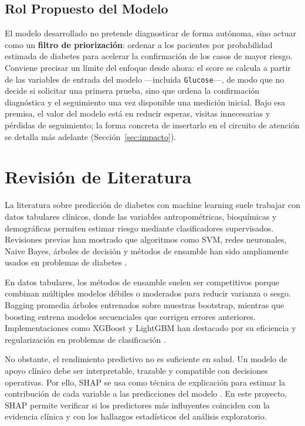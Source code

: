 \documentclass[conference]{IEEEtran}
\newcommand{\code}[1]{\texttt{#1}}
\begin{document}
\subsection{Rol Propuesto del Modelo}

El modelo desarrollado no pretende diagnosticar de forma autónoma, sino actuar como un \textbf{filtro de priorización}: ordenar a los pacientes por probabilidad estimada de diabetes para acelerar la confirmación de los casos de mayor riesgo. Conviene precisar un límite del enfoque desde ahora: el score se calcula a partir de las variables de entrada del modelo ---incluida \code{Glucose}---, de modo que no decide si solicitar una primera prueba, sino que ordena la confirmación diagnóstica y el seguimiento una vez disponible una medición inicial. Bajo esa premisa, el valor del modelo está en reducir esperas, visitas innecesarias y pérdidas de seguimiento; la forma concreta de insertarlo en el circuito de atención se detalla más adelante (Sección~\ref{sec:impacto}).

\section{Revisión de Literatura}

La literatura sobre predicción de diabetes con machine learning suele trabajar con datos tabulares clínicos, donde las variables antropométricas, bioquímicas y demográficas permiten estimar riesgo mediante clasificadores supervisados. Revisiones previas han mostrado que algoritmos como SVM, redes neuronales, Naive Bayes, árboles de decisión y métodos de ensamble han sido ampliamente usados en problemas de diabetes \cite{kavakiotis2017,sisodia2018}.

En datos tabulares, los métodos de ensamble suelen ser competitivos porque combinan múltiples modelos débiles o moderados para reducir varianza o sesgo. Bagging promedia árboles entrenados sobre muestras bootstrap, mientras que boosting entrena modelos secuenciales que corrigen errores anteriores. Implementaciones como XGBoost y LightGBM han destacado por su eficiencia y regularización en problemas de clasificación \cite{chen2016,ke2017}.

No obstante, el rendimiento predictivo no es suficiente en salud. Un modelo de apoyo clínico debe ser interpretable, trazable y compatible con decisiones operativas. Por ello, SHAP se usa como técnica de explicación para estimar la contribución de cada variable a las predicciones del modelo \cite{lundberg2017}. En este proyecto, SHAP permite verificar si los predictores más influyentes coinciden con la evidencia clínica y con los hallazgos estadísticos del análisis exploratorio.
\end{document}
